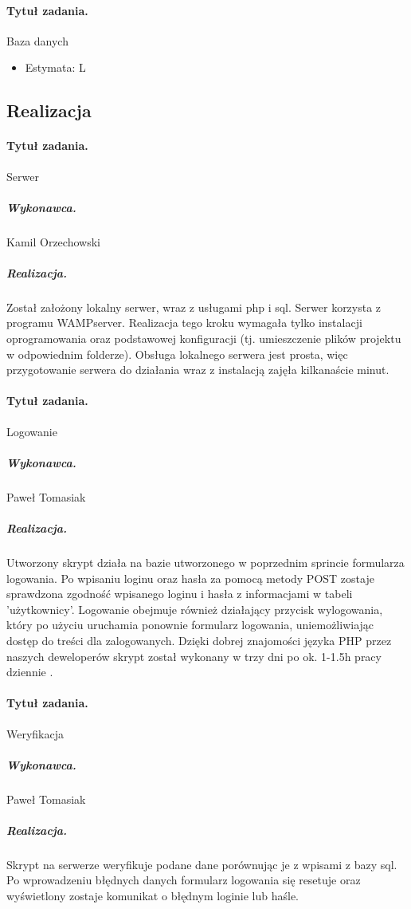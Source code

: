 \documentclass[a4paper]{article}
\begin{document}
\paragraph{Tytuł zadania.} Baza danych
\begin{itemize}
\item Estymata: L
\end{itemize}

\subsection{Realizacja}

\paragraph{Tytuł zadania.} Serwer
\subparagraph{Wykonawca.} Kamil Orzechowski
\subparagraph{Realizacja.} Został założony lokalny serwer, wraz z usługami php i sql. Serwer korzysta z programu WAMPserver. Realizacja tego kroku wymagała tylko instalacji oprogramowania oraz podstawowej konfiguracji (tj. umieszczenie plików projektu w odpowiednim folderze). Obsługa lokalnego serwera jest prosta, więc przygotowanie serwera do działania wraz z instalacją zajęła kilkanaście minut.  

\paragraph{Tytuł zadania.} Logowanie
\subparagraph{Wykonawca.} Paweł Tomasiak
\subparagraph{Realizacja.} Utworzony skrypt działa na bazie utworzonego w poprzednim sprincie formularza logowania. Po wpisaniu loginu oraz hasła za pomocą metody POST zostaje sprawdzona zgodność wpisanego loginu i hasła z informacjami w tabeli 'użytkownicy'. Logowanie obejmuje również działający przycisk wylogowania, który po użyciu uruchamia ponownie formularz logowania, uniemożliwiając dostęp do treści dla zalogowanych. Dzięki dobrej znajomości języka PHP przez naszych deweloperów skrypt został wykonany w trzy dni po ok. 1-1.5h pracy dziennie .

\paragraph{Tytuł zadania.} Weryfikacja
\subparagraph{Wykonawca.} Paweł Tomasiak
\subparagraph{Realizacja.} Skrypt na serwerze weryfikuje podane dane porównując je z wpisami z bazy sql. Po wprowadzeniu błędnych danych formularz logowania się resetuje oraz wyświetlony zostaje komunikat o błędnym loginie lub haśle. 
\end{document}
